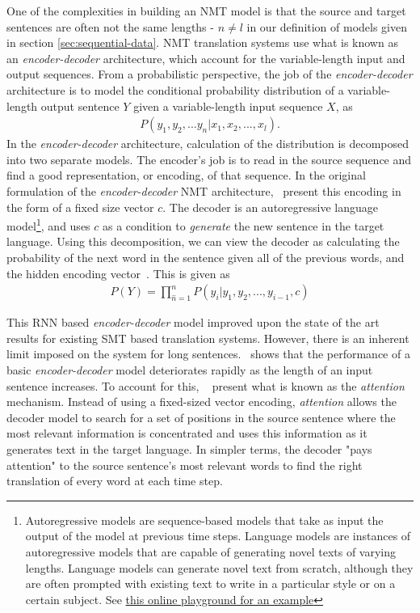 \newcommand{\ed}{\emph{encoder-decoder}}
One of the complexities in building an NMT model is that the source and target sentences are often not the same lengths - $n \neq l$ in our definition of \seq{} models given in section \ref{sec:sequential-data}. NMT translation systems use what is known as an \ed{} architecture, which account for the variable-length input and output sequences. From a probabilistic perspective, the job of the \ed{} architecture is to model the conditional probability distribution of a variable-length output sentence $Y$ given a variable-length input sequence $X$, as
\begin{align*}
P(y_1, y_2, ... y_n | x_1, x_2, ..., x_l). 
\end{align*}
In the \ed{} architecture, calculation of the distribution is decomposed into two separate models. The encoder's job is to read in the source sequence and find a good representation, or encoding, of that sequence. In the original formulation of the \ed{} NMT architecture,~\citet{cho2014learning} present this encoding in the form of a fixed size vector $c$. The decoder is an autoregressive language model\footnote{Autoregressive models are sequence-based models that take as input the output of the model at previous time steps. Language models are instances of autoregressive models that are capable of generating novel texts of varying lengths. Language models can generate novel text from scratch, although they are often prompted with existing text to write in a particular style or on a certain subject. See \href{https://transformer.huggingface.co/doc/distil-gpt2}{this online playground for an example}}, and uses $c$ as a condition to \emph{generate} the new sentence in the target language. Using this decomposition, we can view the decoder as calculating the probability of the next word in the sentence given all of the previous words, and the hidden encoding vector~\cite{bahdanau2014neural}. This is given as
\begin{align*}
P(Y) = \prod_{\hat{n}=1}^{n}P(y_i \vert y_1, y_2, ..., y_{i-1}, c)    
\end{align*}


\newcommand{\at}[1]{\emph{#1}}

This RNN based \ed{} model improved upon the state of the art results for existing SMT based translation systems. However, there is an inherent limit imposed on the system for long sentences.~\citet{cho2014learning} shows that the performance of a basic \ed{} model deteriorates rapidly as the length of an input sentence increases. To account for this, 
~\citet{bahdanau2014neural} present what is known as the \at{attention} mechanism. Instead of using a fixed-sized vector encoding, \at{attention} allows the decoder model to search for a set of positions in the source sentence where the most relevant information is concentrated and uses this information as it generates text in the target language. In simpler terms, the decoder "pays attention" to the source sentence's most relevant words to find the right translation of every word at each time step. 

